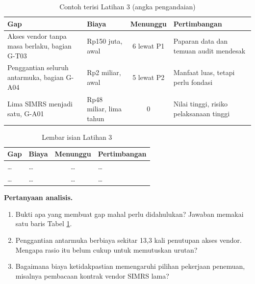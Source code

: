 \begin{table}[!htb]
  \centering
  \caption{Contoh terisi Latihan 3 (angka pengandaian)}
  \label{tab:ch11-lat3-contoh}
  \small
  \begin{tabularx}{\textwidth}{>{\raggedright\arraybackslash}X>{\raggedright\arraybackslash}p{2.2cm}c>{\raggedright\arraybackslash}X}
    \hline
    \textbf{Gap} & \textbf{Biaya} & \textbf{Menunggu} & \textbf{Pertimbangan} \\ \hline
    Akses vendor tanpa masa berlaku, bagian G-T03 & Rp150 juta, awal & 6 lewat P1 & Paparan data dan temuan audit mendesak \\ \hline
    Penggantian seluruh antarmuka, bagian G-A04 & Rp2 miliar, awal & 5 lewat P2 & Manfaat luas, tetapi perlu fondasi \\ \hline
    Lima SIMRS menjadi satu, G-A01 & Rp48 miliar, lima tahun & 0 & Nilai tinggi, risiko pelaksanaan tinggi \\ \hline
  \end{tabularx}
\end{table}

\begin{table}[!htb]
  \centering
  \caption{Lembar isian Latihan 3}
  \label{tab:ch11-lat3-hasil}
  \small
  \begin{tabularx}{\textwidth}{>{\raggedright\arraybackslash}X>{\raggedright\arraybackslash}p{2.2cm}c>{\raggedright\arraybackslash}X}
    \hline
    \textbf{Gap} & \textbf{Biaya} & \textbf{Menunggu} & \textbf{Pertimbangan} \\ \hline
    \dots & \dots & \dots & \dots \\ \hline
    \dots & \dots & \dots & \dots \\ \hline
  \end{tabularx}
\end{table}

\textbf{Pertanyaan analisis.}
\begin{enumerate}
  \item Bukti apa yang membuat gap mahal perlu didahulukan? Jawaban memakai satu baris Tabel \ref{tab:ch11-lat3-contoh}.
  \item Penggantian antarmuka berbiaya sekitar 13,3 kali penutupan akses vendor. Mengapa rasio itu belum cukup untuk memutuskan urutan?
  \item Bagaimana biaya ketidakpastian memengaruhi pilihan pekerjaan penemuan, misalnya pembacaan kontrak vendor SIMRS lama?
\end{enumerate}
